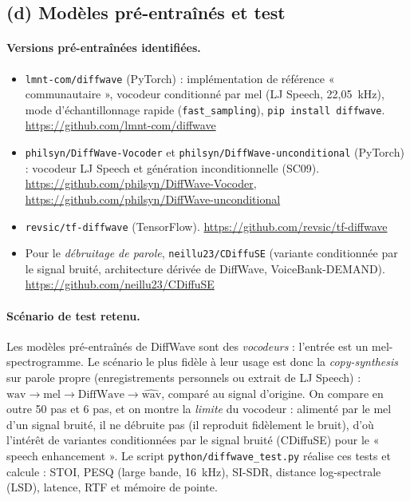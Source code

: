 \subsection{(d) Modèles pré-entraînés et test}
\paragraph{Versions pré-entraînées identifiées.}
\begin{itemize}
 \item \texttt{lmnt-com/diffwave} (PyTorch) : implémentation de référence « communautaire », vocodeur conditionné par mel (LJ Speech, 22,05~kHz), mode d'échantillonnage rapide (\texttt{fast\_sampling}), \texttt{pip install diffwave}. \url{https://github.com/lmnt-com/diffwave}
 \item \texttt{philsyn/DiffWave-Vocoder} et \texttt{philsyn/DiffWave-unconditional} (PyTorch) : vocodeur LJ Speech et génération inconditionnelle (SC09). \url{https://github.com/philsyn/DiffWave-Vocoder}, \url{https://github.com/philsyn/DiffWave-unconditional}
 \item \texttt{revsic/tf-diffwave} (TensorFlow). \url{https://github.com/revsic/tf-diffwave}
 \item Pour le \emph{débruitage de parole}, \texttt{neillu23/CDiffuSE} (variante conditionnée par le signal bruité, architecture dérivée de DiffWave, VoiceBank-DEMAND). \url{https://github.com/neillu23/CDiffuSE}
\end{itemize}

\paragraph{Scénario de test retenu.} Les modèles pré-entraînés de DiffWave sont des \emph{vocodeurs} : l'entrée est un mel-spectrogramme. Le scénario le plus fidèle à leur usage est donc la \emph{copy-synthesis} sur parole propre (enregistrements personnels ou extrait de LJ Speech) : $\text{wav}\to\text{mel}\to\text{DiffWave}\to\widehat{\text{wav}}$, comparé au signal d'origine. On compare en outre 50 pas et 6 pas, et on montre la \emph{limite} du vocodeur : alimenté par le mel d'un signal bruité, il ne débruite pas (il reproduit fidèlement le bruit), d'où l'intérêt de variantes conditionnées par le signal bruité (CDiffuSE) pour le « speech enhancement ». Le script \texttt{python/diffwave\_test.py} réalise ces tests et calcule : STOI, PESQ (large bande, 16~kHz), SI-SDR, distance log-spectrale (LSD), latence, RTF et mémoire de pointe.

